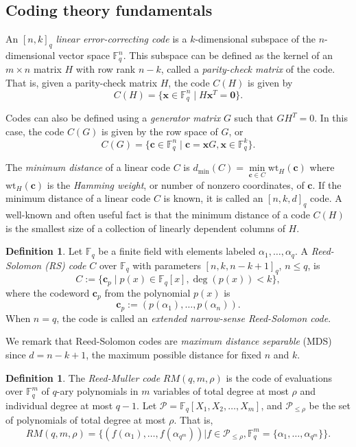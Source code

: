 \documentclass[11pt]{amsart}
\theoremstyle{definition}
\newtheorem{definition}[theorem]{Definition}
\newcommand{\0}{\mathbf{0}}
\newcommand{\F}{\mathbb{F}}
\begin{document}
\subsection{Coding theory fundamentals}

An $[n,k]_q$ \textit{linear error-correcting code} is a $k$-dimensional subspace of the $n$-dimensional vector space $\mathbb{F}_q^n$. This subspace can be defined as the kernel of an $m \times n$ matrix $H$ with row rank $n-k$, called a \textit{parity-check matrix} of the code. That is, given a parity-check matrix $H$, the code $C(H)$ is given by
\[ C(H) = \{ \mathbf{x} \in \mathbb{F}_q^n \mid H \mathbf{x}^T = \mathbf{0}\}. \]

Codes can also be defined using a \textit{generator matrix} $G$ such that $G H^T = 0$. In this case, the code $C(G)$ is given by the row space of $G$, or 
\[ C(G) = \{ \mathbf{c} \in \F_q^n \mid \mathbf{c} = \mathbf{x} G, \mathbf{x} \in \F_q^k \}.\]

The \textit{minimum distance} of a linear code $C$ is $d_{\text{min}}(C) = \min \limits_{\mathbf{c} \in C} \text{wt}_H(\mathbf{c})$ where $\text{wt}_H(\mathbf{c})$ is the \textit{Hamming weight}, or number of nonzero coordinates, of $\mathbf{c}$. If the minimum distance of a linear code $C$ is known, it is called an $[n,k,d]_q$ code. A well-known and often useful fact is that the minimum distance of a code $C(H)$ is the smallest size of a collection of linearly dependent columns of $H$.


\begin{definition} Let $\mathbb{F}_q$ be a finite field with elements labeled $\alpha_1, \ldots, \alpha_q$. A \textit{Reed-Solomon (RS) code} $C$ over $\mathbb{F}_q$ with parameters $[n, k, n-k+1]_q$, $n\leq q$,  is 
\[ C:= \{\mathbf{c}_p \mid p(x)\in \mathbb{F}_q[x], \deg(p(x))<k\}, \] 
where the codeword $\textbf{c}_p$ from the polynomial $p(x)$ is  
\[ \textbf{c}_p:=(p(\alpha_1), \ldots, p(\alpha_n)).\]
When $n=q$, the code is called an \textit{extended narrow-sense Reed-Solomon code}.
\end{definition}

We remark that Reed-Solomon codes are \textit{maximum distance separable} (MDS) since $d=n-k+1$, the maximum possible distance for fixed $n$ and $k$.


\begin{definition}
    The \textit{Reed-Muller code} $RM(q, m, \rho)$ is the code of evaluations over $\mathbb{F}_q^m$ of $q$-ary polynomials in $m$ variables of total degree at most $\rho$ and individual degree at most $q-1$. Let $\mathcal{P}=\mathbb{F}_q[X_1, X_2, \ldots, X_m]$, and $\mathcal{P}_{\leq \rho}$ be the set of polynomials of total degree at most $\rho$.  That is, 
    \[RM(q, m, \rho)= \{(f(\alpha_1), \ldots, f(\alpha_{q^m}))|f\in \mathcal{P}_{\leq \rho},  \mathbb{F}_q^m=\{\alpha_1, \ldots, \alpha_{q^m}\}\}. \] 
\end{definition}
\end{document}
